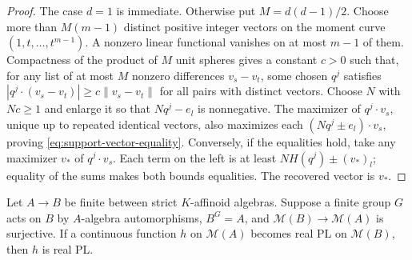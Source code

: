 \documentclass[11pt,a4paper]{amsart}
\begin{document}
\begin{proof}
The case $d=1$ is immediate. Otherwise put $M=d(d-1)/2$. Choose more than $M(m-1)$ distinct positive integer vectors on the moment curve $(1,t,\ldots,t^{m-1})$. A nonzero linear functional vanishes on at most $m-1$ of them. Compactness of the product of $M$ unit spheres gives a constant $c>0$ such that, for any list of at most $M$ nonzero differences $v_s-v_t$, some chosen $q^j$ satisfies $|q^j\cdot(v_s-v_t)|\geq c\|v_s-v_t\|$ for all pairs with distinct vectors. Choose $N$ with $Nc\geq1$ and enlarge it so that $Nq^j-e_l$ is nonnegative. The maximizer of $q^j\cdot v_s$, unique up to repeated identical vectors, also maximizes each $(Nq^j\pm e_l)\cdot v_s$, proving \eqref{eq:support-vector-equality}. Conversely, if the equalities hold, take any maximizer $v_*$ of $q^j\cdot v_s$. Each term on the left is at least $NH(q^j)\pm(v_*)_l$; equality of the sums makes both bounds equalities. The recovered vector is $v_*$.
\end{proof}

\begin{proposition}\label{prop:finite-group-descent}
Let $A\to B$ be finite between strict $K$-affinoid algebras. Suppose a finite group $G$ acts on $B$ by $A$-algebra automorphisms, $B^G=A$, and $\mathcal M(B)\to\mathcal M(A)$ is surjective. If a continuous function $h$ on $\mathcal M(A)$ becomes real PL on $\mathcal M(B)$, then $h$ is real PL.
\end{proposition}
\end{document}
